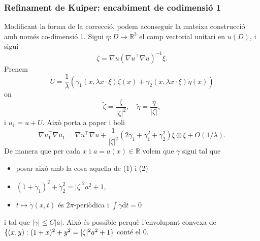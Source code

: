 \subsubsection{Refinament de Kuiper: encabiment de codimensió 1}
Modificant la forma de la correcció, podem aconseguir la mateixa construcció amb només co-dimensió 1. Sigui $\eta:D\to\mathbb R^{3}$ el camp vectorial unitari en $u(D)$, i sigui
$$\zeta = \nabla u (\nabla u^\intercal \nabla u)^{-1}\xi.$$
Prenem 
$$U = \frac1\lambda \left( \gamma_{1}(x, \lambda x \cdot \xi)\tilde{\zeta}(x) + \gamma_{2}(x, \lambda x \cdot \xi)\tilde{\eta}(x) \right)$$
on 
$$\tilde{\zeta} = \frac{\zeta}{|\zeta|^2}, \quad \tilde{\eta} = \frac{\eta}{|\zeta|},$$
i $u_1 = u + U$. Això porta a 
{\color{blue} paper i boli}
$$\nabla u_1^\intercal \nabla u_1 = \nabla u^\intercal \nabla u +\frac{1}{|\zeta|^2}\left( 2\dot\gamma_{1} + \dot\gamma_1^2 + \dot\gamma_{2}^2 \right) \xi \otimes \xi + O(1/\lambda).$$
De manera que per cada $x$ i $a=a(x)\in\mathbb R$ volem que $\gamma$ sigui tal que
\begin{itemize}
    \item {\color{blue} posar això amb la cosa aquella de (1) i (2)}
    \item $(1+\dot\gamma_1)^2+\dot\gamma_2^2=|\zeta|^2a^2+1$,
    \item $t \mapsto \dot\gamma(x,t)$ és $2\pi$-periòdica i $\int\dot\gamma\textrm{d}t=0$
\end{itemize}
i tal que $|\dot\gamma|\le C|a|$. Això és possible perquè l'envolupant convexa de $\{(x,y):(1+x)^2+y^2 = |\zeta|^2a^2+1\}$ conté el $0$. 




\newpage